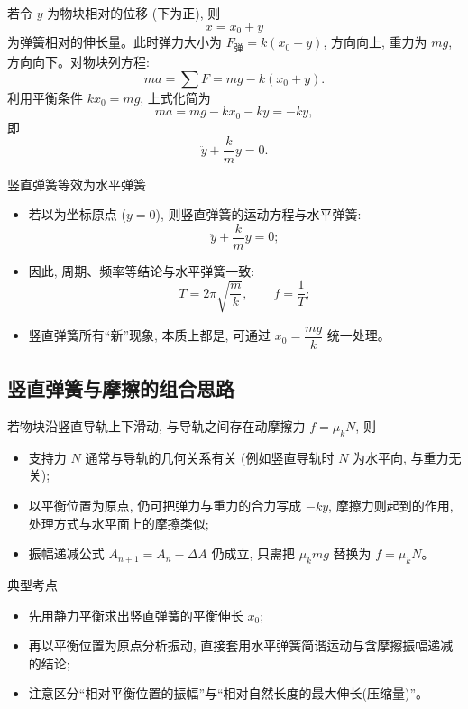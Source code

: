 \documentclass[a4paper,11pt]{ctexart}
\begin{document}
若令 $y$ 为物块相对的位移 (下为正), 则
\[
  x = x_0 + y
\]
为弹簧相对的伸长量。此时弹力大小为 $F_\text{弹}=k(x_0+y)$, 方向向上, 重力为 $mg$, 方向向下。对物块列方程:
\[
  ma = \sum F = mg - k(x_0+y).
\]
利用平衡条件 $k x_0 = mg$, 上式化简为
\[
  ma = mg - kx_0 - ky = -ky,
\]
即
\[
  \ddot{y}+\frac{k}{m}y=0.
\]

\begin{summarybox}{竖直弹簧等效为水平弹簧}
\begin{itemize}
  \item 若以为坐标原点 ($y=0$), 则竖直弹簧的运动方程与水平弹簧:
  \[
    \ddot{y}+\frac{k}{m}y=0;
  \]
  \item 因此, 周期、频率等结论与水平弹簧一致:
  \[
    T=2\pi\sqrt{\frac{m}{k}},\qquad f=\frac{1}{T};
  \]
  \item 竖直弹簧所有“新”现象, 本质上都是, 可通过 $x_0=\dfrac{mg}{k}$ 统一处理。
\end{itemize}
\end{summarybox}

\subsection{竖直弹簧与摩擦的组合思路}

若物块沿竖直导轨上下滑动, 与导轨之间存在动摩擦力 $f=\mu_k N$, 则
\begin{itemize}
  \item 支持力 $N$ 通常与导轨的几何关系有关 (例如竖直导轨时 $N$ 为水平向, 与重力无关);
  \item 以平衡位置为原点, 仍可把弹力与重力的合力写成 $-ky$, 摩擦力则起到的作用, 处理方式与水平面上的摩擦类似;
  \item 振幅递减公式 $A_{n+1}=A_n-\Delta A$ 仍成立, 只需把 $\mu_k mg$ 替换为 $f=\mu_k N$。
\end{itemize}

\begin{notebox}{典型考点}
\begin{itemize}
  \item 先用静力平衡求出竖直弹簧的平衡伸长 $x_0$;
  \item 再以平衡位置为原点分析振动, 直接套用水平弹簧简谐运动与含摩擦振幅递减的结论;
  \item 注意区分“相对平衡位置的振幅”与“相对自然长度的最大伸长(压缩量)”。
\end{itemize}
\end{notebox}
\end{document}
